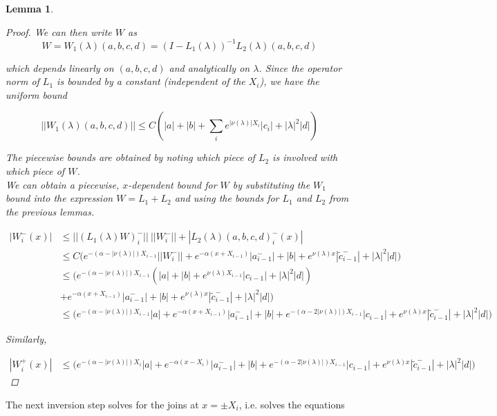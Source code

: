 \documentclass[12pt]{article}
\newtheorem{lemma}{Lemma}
\begin{document}
\begin{lemma}
\begin{proof}
We can then write $W$ as
\[
W = W_1(\lambda)(a,b,c,d) = (I - L_1(\lambda))^{-1} L_2(\lambda)(a,b,c,d)
\]

which depends linearly on $(a,b,c,d)$ and analytically on $\lambda$. Since the operator norm of $L_1$ is bounded by a constant (independent of the $X_i$), we have the uniform bound

\[
||W_1(\lambda)(a,b,c,d)|| \leq C \left(|a| + |b| + \sum_i e^{|\nu(\lambda)|X_i}|c_i| + |\lambda|^2 |d| \right)
\]

The piecewise bounds are obtained by noting which piece of $L_2$ is involved with which piece of $W$.\\

We can obtain a piecewise, $x$-dependent bound for $W$ by substituting the $W_1$ bound into the expression $W = L_1 + L_2$ and using the bounds for $L_1$ and $L_2$ from the previous lemmas.

\begin{align*}
|W_i^-(x)| &\leq ||(L_1(\lambda)W)_i^-||\:||W_i^-|| + |L_2(\lambda)(a,b,c,d)_i^-(x)| \\
&\leq C \Big( e^{-(\alpha -|\nu(\lambda)|)X_{i-1}} ||W_i^-|| + e^{-\alpha(x + X_{i-1})}|a_{i-1}^-| + |b| + e^{\nu(\lambda)x} |\tilde{c}_{i-1}^-| + |\lambda|^2 |d| \Big) \\
&\leq \Big( e^{-(\alpha -|\nu(\lambda)|)X_{i-1}} (|a| + |b| + e^{\nu(\lambda)X_{i-1}}|c_{i-1}| + |\lambda|^2 |d|) \\
&+ e^{-\alpha(x + X_{i-1})}|a_{i-1}^-| + |b| + e^{\nu(\lambda)x} |\tilde{c}_{i-1}^-| + |\lambda|^2 |d| \Big) \\
&\leq \Big( e^{-(\alpha -|\nu(\lambda)|)X_{i-1}} |a| + e^{-\alpha(x + X_{i-1})}|a_{i-1}^-| + |b| + e^{-(\alpha - 2|\nu(\lambda)|)X_{i-1}} |c_{i-1}| + e^{\nu(\lambda)x} |\tilde{c}_{i-1}^-| + |\lambda|^2 |d| \Big)
\end{align*}

Similarly, 

\begin{align*}
|W_i^+(x)| &\leq \Big( e^{-(\alpha -|\nu(\lambda)|)X_i} |a| + e^{-\alpha(x - X_i)}|a_{i-1}^-| + |b| + e^{-(\alpha - 2|\nu(\lambda)|)X_{i-1}} |c_{i-1}| + e^{\nu(\lambda)x} |\tilde{c}_{i-1}^-| + |\lambda|^2 |d| \Big)
\end{align*}

\end{proof}
\end{lemma}

The next inversion step solves for the joins at $x = \pm X_i$, i.e. solves the equations
\end{document}

